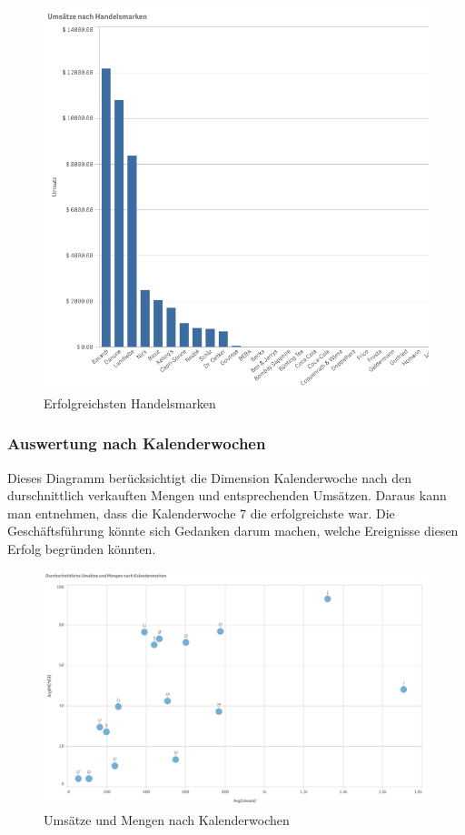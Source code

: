 \begin{figure}[H]
  \centering
  \includegraphics[width=1.1\linewidth]{pictures/ums_handelsmarke.png}
  \caption{Erfolgreichsten Handelsmarken}
  \label{kw}
\end{figure}

\subsubsection{Auswertung nach Kalenderwochen}

Dieses Diagramm berücksichtigt die Dimension Kalenderwoche nach den durschnittlich verkauften Mengen und entsprechenden Umsätzen. Daraus kann man entnehmen, dass die Kalenderwoche 7 die erfolgreichste war. Die Geschäftsführung könnte sich Gedanken darum machen, welche Ereignisse diesen Erfolg begründen könnten.

\begin{figure}[H]
  \centering
  \includegraphics[width=1.2\linewidth]{pictures/kalenderwochen.png}
  \caption{Umsätze und Mengen nach Kalenderwochen}
  \label{kw}
\end{figure}

\newpage

